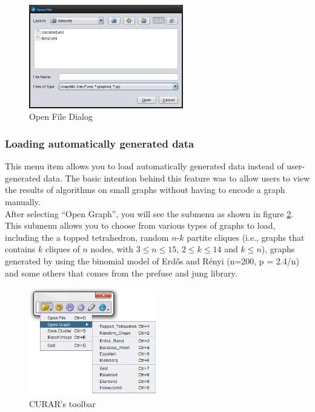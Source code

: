 \documentclass[a4paper, 11pt]{article}
\begin{document}
		\begin{figure}[h!]
		\centering \includegraphics[width = 0.6\textwidth]{img/openfile.png}
		\caption{Open File Dialog}\label{fig:openfile}
		\end{figure}

	\subsubsection{Loading automatically generated data} \label{sec:opengraph}
		This menu item allows you to load automatically generated data instead of user-generated data. 
		The basic intention behind this feature was to allow users to view the results of algorithms on 
		small graphs without having to encode a graph manually.\\ 
		After selecting ``Open Graph'', you will see the submenu as shown in figure \ref{fig:toolbar}. 
		This submenu allows you to choose from various types of graphs to load, including the a topped tetrahedron,  
		random $n$-$k$ partite cliques (i.e., graphs that contains $k$ cliques of $n$ nodes, with 
		$3 \leq n \leq 15$, $2 \leq k \leq 14$ and $k \le n$), 
		graphs generated by using the binomial model of Erd\H{o}s and R\'{e}nyi (n=200, p = 2.4/n) and some others 
		that comes from the prefuse and jung library.
		
		\begin{figure}[ht!]
		\centering \includegraphics[width = 0.5\textwidth]{img/toolbar.png}
		\caption{CURAR's toolbar}\label{fig:toolbar}
		\end{figure}
		
\end{document}

